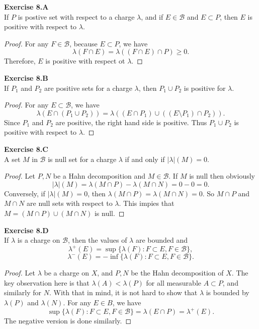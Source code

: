 \documentclass[12pt, a4paper]{article}
\theoremstyle{plain}
\newcommand{\B}{\mathscr{B}}
\newenvironment{exercise}[2][Exercise]
    { \begin{mdframed}[backgroundcolor=gray!20] \textbf{#1 #2} \\}
    {  \end{mdframed}}
\begin{document}
\begin{exercise}{8.A}
    If $P$ is postive set with respect to a charge $\lambda$, and if $E\in \B$ and $E\subset P$, then $E$ is positive with respect to $\lambda$.
\end{exercise}
    \begin{proof}
        For any $F\in\B$, because $E\subset P$, we have 
        \[
        \lambda(F\cap E) = \lambda((F\cap E)\cap P) \geq 0.
        \]
        Therefore, $E$ is positive with respect ot $\lambda$.
    \end{proof}

\begin{exercise}{8.B}
    If $P_1$ and $P_2$ are positive sets for a charge $\lambda$, then $P_1\cup P_2$ is positive for $\lambda$.
\end{exercise}
    \begin{proof}
        For any $E\subset \B$, we have 
        \[
        \lambda(E\cap (P_1\cup P_2)) = \lambda((E\cap P_1)\cup ((E\setminus P_1)\cap P_2)).
        \]
        Since $P_1$ and $P_2$ are positive, the right hand side is positive. Thus $P_1\cup P_2$ is positive with respect to $\lambda$.
    \end{proof}

\begin{exercise}{8.C}
    A set $M$ in $\B$ is null set for a charge $\lambda$ if and only if $|\lambda|(M)=0$.
\end{exercise}
    \begin{proof}
        Let $P,N$ be a Hahn decomposition and $M\in \B$. If $M$ is null then obviously
        \[
        |\lambda|(M) = \lambda(M\cap P)-\lambda(M\cap N)=0-0=0.
        \]
        Conversely, if $|\lambda|(M)=0$, then $\lambda(M\cap P) = \lambda(M\cap N)=0$. So $M\cap P$ and $M\cap N$ are null sets with respect to $\lambda$. This impies that $M=(M\cap P)\cup (M\cap N)$ is null. 
    \end{proof}

\begin{exercise}{8.D}
    If $\lambda$ is a charge on $\B$, then the values of $\lambda$ are bounded and 
    \[
    \lambda^+(E) = \sup\{\lambda(F):F\subset E,F\in\B\},
    \]
    \[
    \lambda^-(E)=-\inf\{\lambda(F):F\subset E,F\in \B\}.
    \]
\end{exercise}
    \begin{proof}
        Let $\lambda$ be a charge on $X$, and $P,N$ be the Hahn decomposition of $X$. The key observation here is that $\lambda(A)<\lambda(P)$ for all measurable $A\subset P$, and similarly for $N$. With that in mind, it is not hard to show that $\lambda$ is bounded by $\lambda(P)$ and $\lambda(N)$. For any $E\in B$, we have 
        \[
        \sup\{\lambda(F):F\subset E,F\in\B\} = \lambda(E\cap P) = \lambda^+(E).
        \]
        The negative version is done similarly.
    \end{proof}
\end{document}
